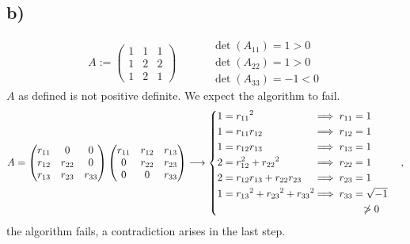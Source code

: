 \documentclass[12pt]{article}
\theoremstyle{definition}
\theoremstyle{definition}
\theoremstyle{definition}
\theoremstyle{definition}
\theoremstyle{definition}
\theoremstyle{example}
\theoremstyle{note}
\theoremstyle{remark}
\theoremstyle{example}
\begin{document}
		\subsection*{b) }
				$$ A := \begin{pmatrix}
					1 & 1 & 1 \\ 1 & 2 & 2 \\ 1 & 2 & 1
			\end{pmatrix} \qquad 
			\begin{align*}
			&\det(A_{11}) = 1 > 0\\
			&\det(A_{22}) = 1 > 0\\
			&\det(A_{33}) = -1 < 0
			\end{align*}$$
			$A$ as defined is not positive definite. We expect the algorithm to fail. 
			$$ A = 
			\begin{pmatrix}
			r_{11} & 0 & 0 \\
			r_{12}	& r_{22} & 0 \\
			r_{13} & r_{23} & r_{33} 
			\end{pmatrix}
			\begin{pmatrix}
			r_{11} & r_{12} & r_{13} \\
			0 &r_{22} & r_{23} \\
			0 & 0 & r_{33}
			\end{pmatrix} \longrightarrow 
			\begin{cases}
			\begin{aligned}
			1 & = {r_{11}}^{2} &&\hspace{-1.3em}\implies r_{11} = 1\\
			1 &= r_{11} r_{12} &&\hspace{-1.3em}\implies r_{12}=1 \\
			1 &= r_{12}r_{13} &&\hspace{-1.3em}\implies r_{13} =1 \\
			2 &= r_{{12}}^{2} + {r_{22}}^{2} &&\hspace{-1.3em}\implies r_{22} =1 \\
			2 &= r_{12} r_{13} + r_{22} r_{23} &&\hspace{-1.3em}\implies r_{23} =1 \\
			1 &= {r_{13}}^{2} + {r_{23}}^{2} + {r_{33}}^{2} &&\hspace{-1.3em}\implies r_{33} = \sqrt{-1} \\ & &&\hspace{-1.3em}\hphantom{\implies r_{33} =} \not> 0
			\end{aligned}
			\end{cases},$$
			the algorithm fails, a contradiction arises in the last step.
\end{document}
